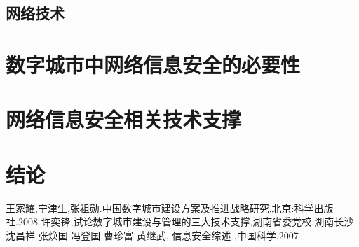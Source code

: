\documentclass[a4paper]{ctexart}
\begin{document}
    \subsection{网络技术}

    \section{数字城市中网络信息安全的必要性}
    \section{网络信息安全相关技术支撑}
    \section{结论}
    \begin{thebibliography}{sotief}
             王家耀,宁津生,张祖勋.中国数字城市建设方案及推进战略研究.北京:科学出版社.2008
            许奕锋,试论数字城市建设与管理的三大技术支撑,湖南省委党校,湖南长沙
             沈昌祥 张焕国 冯登国 曹珍富 黄继武, 信息安全综述 ,中国科学,2007
    \end{thebibliography}
\end{document}
